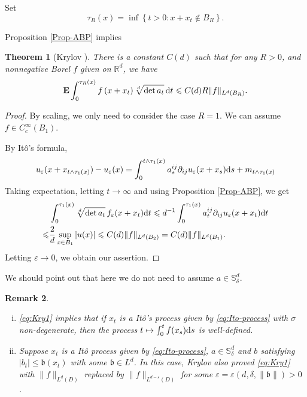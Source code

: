 \documentclass[twoside, 12pt]{book}
\numberwithin{equation}{chapter}
\newtheorem{theorem}{Theorem}[section]
\newtheorem{remark}[theorem]{Remark}
\def\mS{{\mathbb S}}
\def\bE{{\mathbf E}}
\def\l{\left}
\def\r{\right}
\def\leq{\leqslant}
\def\p{\partial}
\def\d{\text{\rm{d}}}
\def\eps{\varepsilon}
\begin{document}
	
	\medspace
	
	Set 
	\[
	\tau_R(x)=\inf\l\{t>0: x+x_t\notin B_R \r\}. 
	\]
	
	Proposition \ref{Prop-ABP} implies 
	\begin{theorem}[Krylov \cite{krylov1980controlled}]\label{thm:Krylov1}
		There is a constant $C(d)$ such that for any $R>0$, and nonnegative Borel $f$ given on $\mathbb{R}^d$, we have
		\begin{equation}\label{eq:Kry1}
			\bE \int_0^{\tau_{R}(x)} f\left(x+x_t\right) \sqrt[d]{\operatorname{det} a_t} \, \d t \leq C(d)  R\|f\|_{L^d\left(B_R\right)}. 
		\end{equation}
	\end{theorem}
    \begin{proof}
      By scaling, we only need to consider the case $R=1$. We can assume $f\in C_c^\infty(B_1)$. 
      
      By It\^o's formula, 
        \begin{equation*}
            u_\eps (x+x_{t\wedge \tau_1(x)})-u_\eps(x) = \int_0^{t\wedge \tau_1(x)} a^{ij}_s \p_{ij} u_\eps(x+x_s) \d s + m_{t\wedge \tau_1(x)}
        \end{equation*}
      Taking expectation, letting $t\to\infty$ and using Proposition \ref{Prop-ABP}, we get 
      \begin{align*}
          &\int_0^{\tau_1(x)}\sqrt[d]{\det a_t} \, f_{\eps}(x+x_t) \d t  \leq d^{-1}\int_0^{\tau_1(x)} a^{ij}_t \p_{ij}u_\eps(x+x_t) \d t \\
          \leq& \frac{2}{d}\sup_{x\in B_{1}}|u(x)|\leq C(d) \|f\|_{L^d(B_2)}=C(d) \|f\|_{L^d(B_1)}.
      \end{align*}
      Letting $\eps\to0$, we obtain our assertion. 
    \end{proof}
	We should point out that here we do not need to assume $a\in \mS_\delta^d$.  
	\begin{remark}
        \begin{enumerate}[(i)]
         \item \eqref{eq:Kry1} implies that if $x_t$ is a It\^o's process given by \eqref{eq:Ito-process} with $\sigma$ non-degenerate, then the process $t\mapsto \int_0^t f(x_s) \d s$ is well-defined. 
         \item Suppose $x_t$ is a It\^o process given by \eqref{eq:Ito-process}, $a\in \mS^d_\delta$ and $b$ satisfying $|b_t|\leq \mathfrak{b}(x_t)$  with some $\mathfrak{b}\in L^d$.  In this case, Krylov \cite{krylov2021diffusion}  also proved \eqref{eq:Kry1}  with $\|f\|_{L^d(D)}$ replaced by $\|f\|_{L^{d-\eps}(D)}$ for some $\eps=\eps(d, \delta, \|\mathfrak{b}\|)>0$ . 
       \end{enumerate}
	\end{remark}
	
\end{document}
